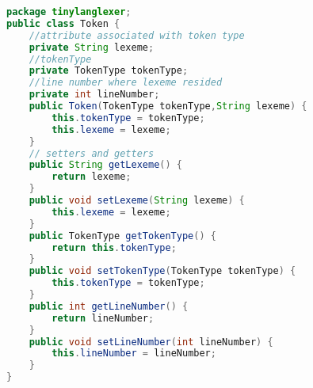 \begin{lstlisting}[basicstyle=\miniscule,language=Java,caption={Token=(TokenType,(Lexeme,LineNumber))},label=listing:token]
package tinylanglexer;
public class Token {
	//attribute associated with token type
	private String lexeme;
	//tokenType
	private TokenType tokenType;
	//line number where lexeme resided
	private int lineNumber;
	public Token(TokenType tokenType,String lexeme) {
		this.tokenType = tokenType;
		this.lexeme = lexeme;
	}
	// setters and getters
	public String getLexeme() {
		return lexeme;
	}
	public void setLexeme(String lexeme) {
		this.lexeme = lexeme;
	}
	public TokenType getTokenType() {
		return this.tokenType;
	}
	public void setTokenType(TokenType tokenType) {
		this.tokenType = tokenType;	
	}
	public int getLineNumber() {
		return lineNumber;
	}
	public void setLineNumber(int lineNumber) {
		this.lineNumber = lineNumber;
	}
}
\end{lstlisting}
